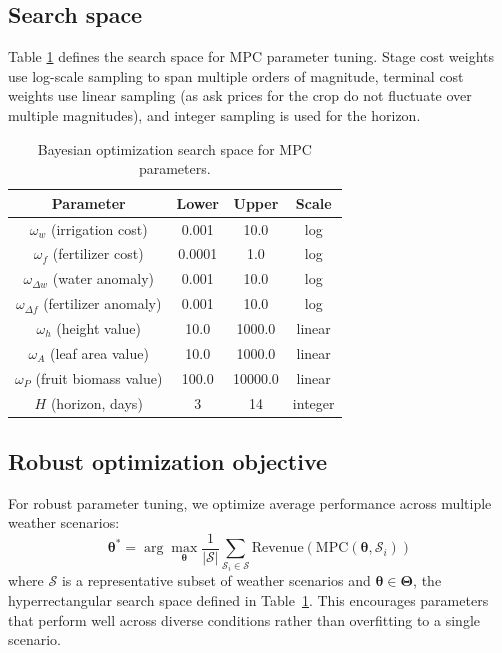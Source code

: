 \documentclass[preprint,12pt]{elsarticle}
\newcommand{\df}[2]{\displaystyle\frac{#1}{#2}}
\begin{document}
\subsection{Search space}\label{subsec:search-space}

Table \ref{tab:search-space} defines the search space for MPC parameter tuning. Stage cost weights use log-scale sampling to span multiple orders of magnitude, terminal cost weights use linear sampling (as ask prices for the crop do not fluctuate over multiple magnitudes), and integer sampling is used for the horizon.

\begin{table}[ht]
\centering
\begin{tabular}{|c|c|c|c|}
\hline
Parameter & Lower & Upper & Scale \\
\hline\hline
$\omega_w$          (irrigation cost)     & 0.001  & 10.0    & log     \\
$\omega_f$          (fertilizer cost)     & 0.0001 & 1.0     & log     \\
$\omega_{\Delta w}$ (water anomaly)       & 0.001  & 10.0    & log     \\
$\omega_{\Delta f}$ (fertilizer anomaly)  & 0.001  & 10.0    & log     \\
$\omega_h$          (height value)        & 10.0   & 1000.0  & linear  \\
$\omega_A$          (leaf area value)     & 10.0   & 1000.0  & linear  \\
$\omega_P$          (fruit biomass value) & 100.0  & 10000.0 & linear  \\
$H$                 (horizon, days)       & 3      & 14      & integer \\
\hline
\end{tabular}
\caption{Bayesian optimization search space for MPC parameters.}
\label{tab:search-space}
\end{table}


\subsection{Robust optimization objective}\label{subsec:robust-objective}

For robust parameter tuning, we optimize average performance across multiple weather scenarios:
\begin{equation}
\boldsymbol{\theta}^* = \arg\max_{\boldsymbol{\theta}} \df{1}{|\mathcal{S}|} \sum_{\mathcal{S}_i \in \mathcal{S}} \text{Revenue}(\text{MPC}(\boldsymbol{\theta}, \mathcal{S}_i))
\label{eqn:robust-objective}
\end{equation}
where $\mathcal{S}$ is a representative subset of weather scenarios and $\boldsymbol{\theta} \in \boldsymbol{\Theta}$, the hyperrectangular search space defined in Table~\ref{tab:search-space}. This encourages parameters that perform well across diverse conditions rather than overfitting to a single scenario.
\end{document}
